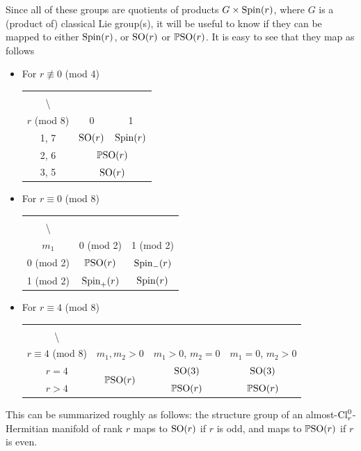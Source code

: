 \documentclass[10pt,a4paper]{amsart}
\newcommand\tstrut{\rule{0pt}{2.6ex}}
\numberwithin{equation}{section}
\newcommand{\backslashbox}[2]{\shortstack{#2\\\textbackslash\\#1}}
\begin{document}
Since all of these groups are quotients of products $G\times {\rm Spin}(r)$, where $G$ is a (product of) classical Lie group(s), it will be useful to know if they can be mapped to either ${\rm Spin}(r)$, or ${\rm SO}(r)$ or $\mathbb{P}{\rm SO}(r)$. It is easy to see that they map as follows
\begin{itemize}\itemsep=0pt
 \item
 For $r\not \equiv 0$ (mod 4)
\begin{center}
\begin{tabular}{|c|c|c|}\hline
\backslashbox{$r$ (mod 8)}{$m$ (mod 2)} & 0 & 1 \rule{0pt}{3ex} \\\hline
1, 7 & ${\rm SO}(r)$ & ${\rm Spin}(r)$ \tstrut\\\hline
2, 6 & \multicolumn{2}{c|}{$\mathbb{P}{\rm SO}(r)$} \tstrut\\\hline
3, 5 & \multicolumn{2}{c|}{${\rm SO}(r)$} \tstrut\\\hline
\end{tabular}
\end{center}
\item
For $r\equiv 0$ (mod 8)
\begin{center}
\begin{tabular}{|c|c|c|}\hline
\backslashbox{$m_1$}{$m_2$} & 0 (mod 2) & 1 (mod 2) \tstrut\\\hline
0 (mod 2)& $\mathbb{P}{\rm SO}(r)$ & ${\rm Spin}_-(r)$\tstrut\\\hline
1 (mod 2)& ${\rm Spin}_+(r)$ & ${\rm Spin}(r)$ \tstrut\\\hline
\end{tabular}
\end{center}
\item
For $r\equiv 4$ (mod 8){\samepage
\begin{center}
\begin{tabular}{|c|c|c|c|}\hline
\backslashbox{$r\equiv 4$ (mod 8)}{$m_1$, $m_2$} & $m_1,m_2>0$ & $m_1>0$, $m_2=0$ & $m_1=0$, $m_2>0$ \rule{0pt}{3ex} \\\hline
$r=4$ & \multirow{2}{*}{$\mathbb{P}{\rm SO}(r)$} &
 ${\rm SO}(3)$ & ${\rm SO}(3)$ \tstrut\\\hhline{-~--}
$r>4$ & & $\mathbb{P}{\rm SO}(r)$ & $\mathbb{P}{\rm SO}(r)$ \tstrut\\\hline
\end{tabular}
\end{center}}
\end{itemize}
This can be summarized roughly as follows: the structure group of an almost-${\rm Cl}_r^0$-Hermitian manifold of rank $r$ maps to ${\rm SO}(r)$ if $r$ is odd, and maps to $\mathbb{P}{\rm SO}(r)$ if $r$ is even.
\end{document}
